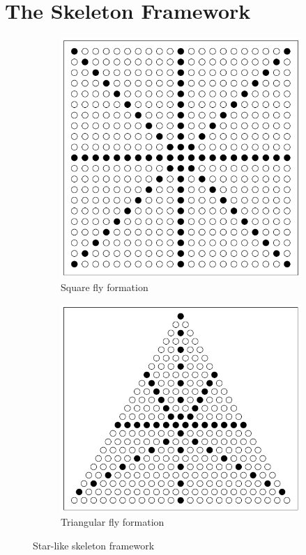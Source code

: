 \documentclass[a4paper,12pt]{report}
\begin{document}
\section{The Skeleton Framework}
\begin{figure}[tbph]
\begin{subfigure}{.5\textwidth}
  \centering
  \includegraphics[width=.8\linewidth]{images/square.png}
  \caption{Square fly formation}
  \label{fig:sfig1}
\end{subfigure}%
\begin{subfigure}{.5\textwidth}
  \centering
  \includegraphics[width=.8\linewidth]{images/triangle.png}
  \caption{Triangular fly formation}
  \label{fig:sfig2}
\end{subfigure}
\caption{Star-like skeleton framework}
\label{fig:fig}
\end{figure}
\end{document}
